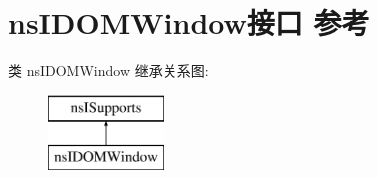 \hypertarget{interfacens_i_d_o_m_window}{}\section{ns\+I\+D\+O\+M\+Window接口 参考}
\label{interfacens_i_d_o_m_window}
类 ns\+I\+D\+O\+M\+Window 继承关系图\+:\begin{figure}[H]
\begin{center}
\leavevmode
\includegraphics[height=2.000000cm]{interfacens_i_d_o_m_window}
\end{center}
\end{figure}
